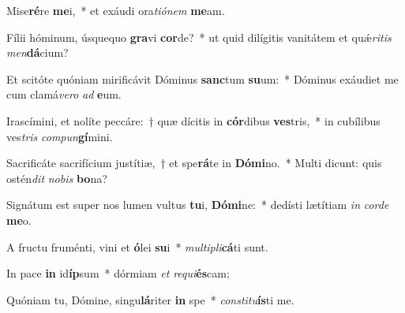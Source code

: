 \item Mise\textbf{ré}re \textbf{me}i,~* et exáudi ora\textit{ti}\textit{ó}\textit{nem} \textbf{me}am.
\item Fílii hóminum, úsquequo \textbf{gra}vi \textbf{cor}de?~* ut quid dilígitis vanitátem et quǽ\textit{ri}\textit{tis} \textit{men}\textbf{dá}cium?
\item Et scitóte quóniam mirificávit Dóminus \textbf{sanc}tum \textbf{su}um:~* Dóminus exáudiet me cum clamá\textit{ve}\textit{ro} \textit{ad} \textbf{e}um.
\item Irascímini, et nolíte peccáre:~† quæ dícitis in \textbf{cór}dibus \textbf{ves}tris,~* in cubílibus ves\textit{tris} \textit{com}\textit{pun}\textbf{gí}mini.
\item Sacrificáte sacrifícium justítiæ,~† et spe\textbf{rá}te in \textbf{Dó}\textbf{mi}no.~* Multi dicunt: quis ostén\textit{dit} \textit{no}\textit{bis} \textbf{bo}na?
\item Signátum est super nos lumen vultus \textbf{tu}i, \textbf{Dó}\textbf{mi}ne:~* dedísti lætítiam \textit{in} \textit{cor}\textit{de} \textbf{me}o.
\item A fructu fruménti, vini et \textbf{ó}lei \textbf{su}i~* \textit{mul}\textit{ti}\textit{pli}\textbf{cá}ti sunt.
\item In pace \textbf{in} id\textbf{íp}sum~* dórmiam \textit{et} \textit{re}\textit{qui}\textbf{és}cam;
\item Quóniam tu, Dómine, singu\textbf{lá}riter \textbf{in} spe~* \textit{con}\textit{sti}\textit{tu}\textbf{ís}ti me.
